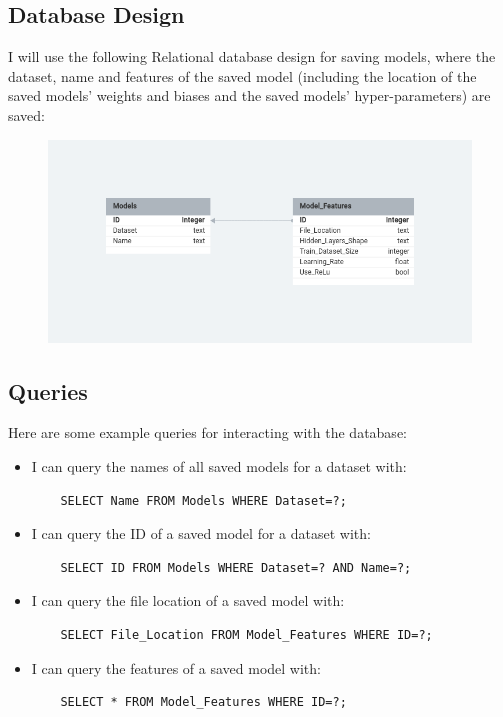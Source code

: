 \documentclass[./project-report/src/latex/project-report.tex]{subfiles}
\begin{document}
\subsection{Database Design}

I will use the following Relational database design for saving models, where the dataset, name and features of the saved model (including the location of the 
saved models' weights and biases and the saved models' hyper-parameters) are saved:

\begin{figure}[h!]
\centering
\includegraphics[width=1\textwidth]{./project-report/src/images/database-design.png}
\end{figure}

\subsection{Queries}

Here are some example queries for interacting with the database:

\begin{itemize}
    \item I can query the names of all saved models for a dataset with:
    \begin{verbatim}
    SELECT Name FROM Models WHERE Dataset=?;
    \end{verbatim}
    \item I can query the ID of a saved model for a dataset with:
    \begin{verbatim}
    SELECT ID FROM Models WHERE Dataset=? AND Name=?;
    \end{verbatim}
    \item I can query the file location of a saved model with:
    \begin{verbatim}
    SELECT File_Location FROM Model_Features WHERE ID=?;
    \end{verbatim}
    \item I can query the features of a saved model with:
    \begin{verbatim}
    SELECT * FROM Model_Features WHERE ID=?;
    \end{verbatim}
\end{itemize}
\end{document}
